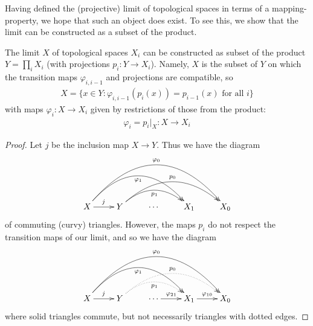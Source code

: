       Having defined the (projective) limit of topological spaces in terms of a mapping-property, we hope that such an object does exist.
      To see this, we show that the limit can be constructed as a subset of the product.
      \begin{claim}
        The limit $X$ of topological spaces $X_i$ can be constructed as subset of the product $Y=\prod_i X_i$ (with projections $p_i:Y\rightarrow X_i$).
        Namely, $X$ is the subset of $Y$ on which the transition maps $\varphi_{i,i-1}$ and projections are compatible, so
        \begin{align*}
          X = \{x\in Y: \varphi_{i,i-1}(p_i(x)) = p_{i-1}(x) \text{ for all } i\}
        \end{align*}
        with maps $\varphi_i:X\rightarrow X_i$ given by restrictions of those from the product:
        \begin{align*}
          \varphi_i = p_i|_X :X\rightarrow X_i
        \end{align*}
        \begin{proof}
          Let $j$ be the inclusion map $X\rightarrow Y$.
          Thus we have the diagram
          \begin{displaymath}
            \xymatrix{
              X \ar[r]^j \ar@/^37pt/[rrr]_{\varphi_1} \ar@/^50pt/[rrrr]^{\varphi_0}
              & Y \ar@/^20pt/[rr]_{p_1} \ar@/^30pt/[rrr]^{p_0}
              & \cdots
              & X_1
              & X_0
            }
          \end{displaymath}
          of commuting (curvy) triangles.
          However, the maps $p_i$ do not respect the transition maps of our limit, and so we have the diagram
          \begin{displaymath}
            \xymatrix{
              X \ar[r]^j \ar@/^37pt/[rrr]_{\varphi_1} \ar@/^50pt/[rrrr]^{\varphi_0}
              & Y \ar@/^20pt/@{..>}[rr]_{p_1} \ar@/^30pt/@{..>}[rrr]^{p_0}
              & \cdots \ar[r]^{\varphi_{21}}
              & X_1 \ar[r]^{\varphi_{10}}
              & X_0
            }
          \end{displaymath}
          where solid triangles commute, but not necessarily triangles with dotted edges.
          

\end{proof}
\end{claim}
